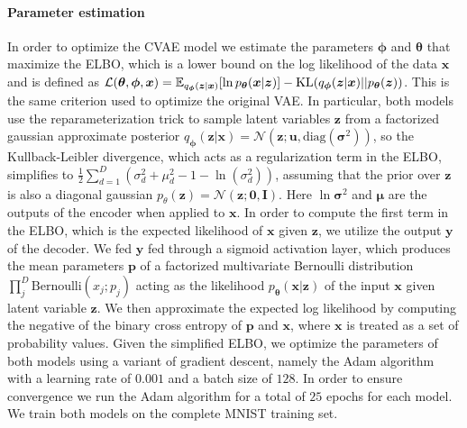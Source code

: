 \paragraph{Parameter estimation}
In order to optimize the CVAE model we estimate the parameters $\bm{\phi}$ and $\bm{\theta}$ that maximize the ELBO, which is a lower bound on the log likelihood of the data $\bm{x}$ and is defined as $\mathcal{L}(\bm{\theta}, \bm{\phi}, \bm{x}) = \E_{q_{\bm{\phi}}(\bm{z}|\bm{x})}{[\ln{p_{\bm{\theta}}(\bm{x} |\bm{z} )}]} - \KL (q_{\bm{\phi}}(\bm{z}|\bm{x}) || p_{\bm{\theta}}(\bm{z}) )$. This is the same criterion used to optimize the original VAE\@. In particular, both models use the reparameterization trick to sample latent variables $\bm{z}$ from a factorized gaussian approximate posterior $q_{\bm{\phi}}(\bm{z}|\bm{x}) = \mathcal{N}(\bm{z}; \bm{u}, \text{diag}(\bm{\sigma}^2))$, so the Kullback-Leibler divergence, which acts as a regularization term in the ELBO, simplifies to $\frac{1}{2}\sum_{d=1}^{D}(\sigma_d^2 + \mu_d^2 - 1 - \ln(\sigma_d^2))$, assuming that the prior over $\bm{z}$ is also a diagonal gaussian $p_{\theta}(\bm{z}) = \mathcal{N}(\bm{z};\bm{0}, \bm{I})$. Here $\ln{\bm{\sigma}^2}$ and $\bm{\mu}$ are the outputs of the encoder when applied to $\bm{x}$. In order to compute the first term in the ELBO, which is the expected likelihood of $\bm{x}$ given $\bm{z}$, we utilize the output $\bm{y}$ of the decoder. We fed $\bm{y}$ fed through a sigmoid activation layer, which produces the mean parameters $\bm{p}$ of a factorized multivariate Bernoulli distribution $\prod_j^{D} \text{Bernoulli}(x_j; p_j)$ acting as the likelihood $p_{\bm{\theta}}(\bm{x} |\bm{z} )$ of the input $\bm{x}$ given latent variable $\bm{z}$. \iffalse As such, one may regard both VAE models as making the simplifying assumption that the MNIST data is binary, which is not technically the case. The simplifying assumption is most likely warranted given that the vast majority of pixels in the MNIST dataset are in fact either $0$ or $1$. Given this simplification , \fi We then approximate  the expected log likelihood by computing the negative of the binary cross entropy of $\bm{p}$ and $\bm{x}$, where $\bm{x}$ is treated as a set of probability values. Given the simplified ELBO, we optimize the parameters of both models using a variant of gradient descent, namely the Adam algorithm with a learning rate of $0.001$ and a batch size of $128$. In order to ensure convergence we run the Adam algorithm for a total of $25$ epochs for each model. We train both models on the complete MNIST training set.

